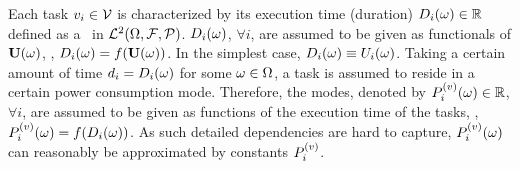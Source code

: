 Each task $v_i \in \mathcal{V}$ is characterized by its execution time (duration) $D_i(\omega) \in \mathbb{R}$ defined as a \rv\ in $\mathcal{L}^{2}(\Omega, \mathcal{F}, \mathcal{P})$. $D_i(\omega)$, $\forall i$, are assumed to be given as functionals of $\mathbf{U}(\omega)$, \ie, $D_i(\omega) = f(\mathbf{U}(\omega))$. In the simplest case, $D_i(\omega) \equiv U_i(\omega)$. Taking a certain amount of time $d_i = D_i(\omega)$ for some $\omega \in \Omega$, a task is assumed to reside in a certain power consumption mode. Therefore, the modes, denoted by $P^{(v)}_i(\omega) \in \mathbb{R}$, $\forall i$, are assumed to be given as functions of the execution time of the tasks, \ie, $P^{(v)}_i(\omega) = f(D_i(\omega))$. As such detailed dependencies are hard to capture, $P^{(v)}_i(\omega)$ can reasonably be approximated by constants $P^{(v)}_i$.
